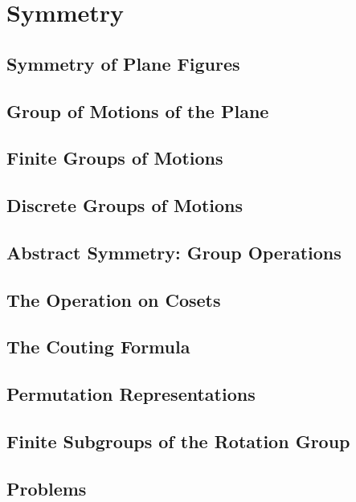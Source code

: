 \chapter{Symmetry}
\section{Symmetry of Plane Figures}
\section{Group of Motions of the Plane}
\section{Finite Groups of Motions}
\section{Discrete Groups of Motions}
\section{Abstract Symmetry: Group Operations}
\section{The Operation on Cosets}
\section{The Couting Formula}
\section{Permutation Representations}
\section{Finite Subgroups of the Rotation Group}
\section{Problems}